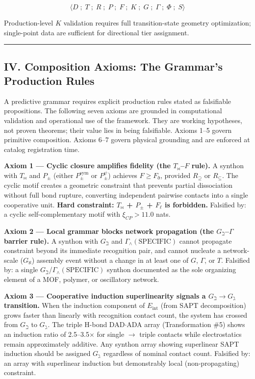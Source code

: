 \documentclass[12pt,a4paper]{article}
\begin{document}
\[\langle D \;;\; T \;;\; R \;;\; P \;;\; F \;;\; K \;;\; G \;;\; \Gamma \;;\; \Phi \;;\; S \rangle\]

Production-level $K$ validation requires full transition-state geometry optimization; single-point data are sufficient for directional tier assignment.

\begin{center}
\rule{0.5\textwidth}{0.4pt}
\end{center}

\subsection{IV. Composition Axioms: The Grammar's Production Rules}

A predictive grammar requires explicit production rules stated as falsifiable propositions. The following seven axioms are grounded in computational validation and operational use of the framework. They are working hypotheses, not proven theorems; their value lies in being falsifiable. Axioms 1--5 govern primitive composition. Axioms 6--7 govern physical grounding and are enforced at catalog registration time.

\textbf{Axiom 1 --- Cyclic closure amplifies fidelity (the $T_{\bowtie}$--$F$ rule).}
A synthon with $T_{\bowtie}$ and $P_{\pm}$ (either $P_{\pm}^{\text{sym}}$ or $P_{\pm}^{\psi}$) achieves $F \geq F_{\eth}$, provided $R_{\supseteq}$ or $R_{\subseteq}$. The cyclic motif creates a geometric constraint that prevents partial dissociation without full bond rupture, converting independent pairwise contacts into a single cooperative unit. \textbf{Hard constraint: $T_{\bowtie}$ + $P_{\pm}$ + $F_{\ell}$ is forbidden.} Falsified by: a cyclic self-complementary motif with $\xi_{CP} > 11.0$ nats.

\textbf{Axiom 2 --- Local grammar blocks network propagation (the $G_{\beth}$--$\Gamma$ barrier rule).}
A synthon with $G_{\beth}$ and $\Gamma_{\wedge}(\text{SPECIFIC})$ cannot propagate constraint beyond its immediate recognition pair, and cannot nucleate a network-scale ($G_{\aleph}$) assembly event without a change in at least one of $G$, $\Gamma$, or $T$. Falsified by: a single $G_{\beth}$/$\Gamma_{\wedge}(\text{SPECIFIC})$ synthon documented as the sole organizing element of a MOF, polymer, or oscillatory network.

\textbf{Axiom 3 --- Cooperative induction superlinearity signals a $G_{\beth} \to G_{\gimel}$ transition.}
When the induction component of $E_{\text{int}}$ (from SAPT decomposition) grows faster than linearly with recognition contact count, the system has crossed from $G_{\beth}$ to $G_{\gimel}$. The triple H-bond DAD$\cdot$ADA array (Transformation \#5) shows an induction ratio of 2.5--3.5$\times$ for single $\to$ triple contacts while electrostatics remain approximately additive. Any synthon array showing superlinear SAPT induction should be assigned $G_{\gimel}$ regardless of nominal contact count. Falsified by: an array with superlinear induction but demonstrably local (non-propagating) constraint.
\end{document}
